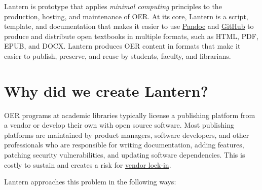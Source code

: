 \documentclass{book}
\begin{document}
Lantern is prototype that applies \emph{minimal computing} principles to the
production, hosting, and maintenance of OER. At its core, Lantern is a script,
template, and documentation that makes it easier to use
\href{http://pandoc.org/}{Pandoc} and \href{https://github.com/}{GitHub} to
produce and distribute open textbooks in multiple formats, such as HTML, PDF,
EPUB, and DOCX. Lantern produces OER content in formats that make it easier to
publish, preserve, and reuse by students, faculty, and librarians.

\hypertarget{why-did-we-create-lantern}{%
\section{Why did we create Lantern?}\label{why-did-we-create-lantern}}

OER programs at academic libraries typically license a publishing platform
from a vendor or develop their own with open source software. Most publishing
platforms are maintained by product managers, software developers, and other
professionals who are responsible for writing documentation, adding features,
patching security vulnerabilities, and updating software dependencies. This is
costly to sustain and creates a risk for
\href{https://en.wikipedia.org/wiki/Vendor_lock-in}{vendor lock-in}.

Lantern approaches this problem in the following ways:
\end{document}

